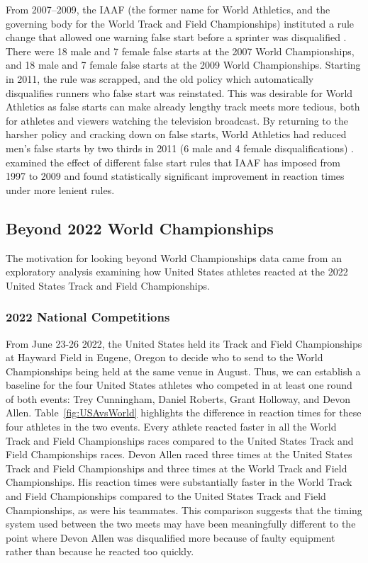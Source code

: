\documentclass[12pt, letterpaper, titlepage]{article}
\begin{document}
From 2007--2009, the IAAF (the former name for World Athletics, and the 
governing body for the World Track and Field Championships) instituted a rule 
change that allowed one warning false start before a sprinter was disqualified 
\citep{iaaf2009falsestart}. There were 18 male and 7 female false starts at the 
2007 World Championships, and 18 male and 7 female false starts at the 2009 World 
Championships. Starting in 2011, the rule was scrapped, and the old policy which
automatically disqualifies runners who false start was reinstated. This was 
desirable for World Athletics as false starts can make already lengthy track 
meets more tedious, both for athletes and viewers watching the television 
broadcast. By returning to the harsher policy and cracking down on false starts,
World Athletics had reduced men's false starts by two thirds in 2011 (6 male and
4 female disqualifications) \citep{iaaf2009falsestart}. \citet{haugen2013effect}
examined the effect of different false start rules that IAAF has imposed from 
1997 to 2009 and found statistically significant improvement in reaction times 
under more lenient rules.




\subsection{Beyond 2022 World Championships}\label{sec:databeyond}
The motivation for looking beyond World Championships data came from an 
exploratory analysis examining how United States athletes reacted at the 
2022 United States Track and Field Championships.

\subsubsection{2022 National Competitions}\label{sec:datanational}
From June 23-26 2022, the United States held its Track and Field Championships 
at Hayward Field in Eugene, Oregon to decide who to send to the World 
Championships being held at the same venue in August. Thus, we can establish a 
baseline for the four United States athletes who competed in at least one round 
of both events: Trey Cunningham, Daniel Roberts, 
Grant Holloway, and Devon Allen. Table~\ref{fig:USAvsWorld} highlights the 
difference in reaction times for these four athletes in the two events. 
Every athlete reacted faster in all the World 
Track and Field Championships races compared to the United States Track and Field 
Championships races. Devon Allen raced three times at the United States Track and
Field Championships and three times at the World Track and Field Championships. 
His reaction times were substantially faster in the World Track and
Field Championships compared to the United States Track and Field Championships, 
as were his teammates. 
This comparison suggests that the timing system used between the two
meets may have been meaningfully different to the point where Devon Allen was
disqualified more because of faulty equipment rather than because he reacted
too quickly.  
\end{document}
